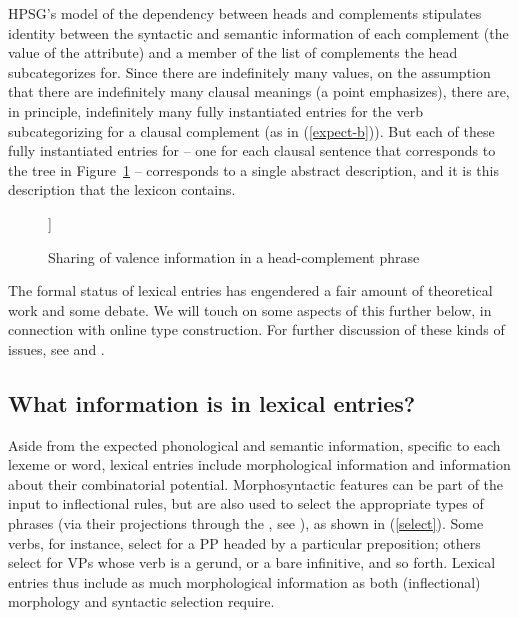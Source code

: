 \documentclass[output=paper
 	        ,biblatex
                ,babelshorthands
                ,newtxmath
                ,draftmode
                ,colorlinks, citecolor=brown
]{langscibook}
\begin{document}
HPSG's model of the dependency between heads and complements stipulates identity between the syntactic and semantic information of each complement (the value of the  attribute) and a member of the list of complements the head subcategorizes for. 
Since there are indefinitely many  values, on the assumption that there are indefinitely many clausal meanings (a point \citealt[8--9]{Jackendoff1990} emphasizes), there are, in principle, indefinitely many fully instantiated entries for the verb  subcategorizing for a clausal complement (as in (\ref{expect-b})). 
But each of these fully instantiated entries for  -- one for each clausal sentence that corresponds to the tree in Figure~\ref{expect-b-tree} -- corresponds to a single abstract description, and it is this description that the lexicon contains. 

\begin{figure}
	\begin{forest}
	[ [{\avm{[comps & < \1 >]}} ] 
	[{\avm{[synsem & \1 ]}} ] ]
\end{forest}	
\caption{\label{expect-b-tree} Sharing of valence information in a head-complement phrase}
\end{figure}


The formal status of lexical entries has engendered a fair amount of theoretical work and some debate.
We will touch on some aspects of this further below, in connection with online type construction.
For further discussion of these kinds of issues, see  and .

\subsection{What information is in lexical entries?}

Aside from the expected phonological and semantic information, specific to each lexeme or word, lexical entries include morphological information and information about their combinatorial potential. Morphosyntactic features can be part of the input to inflectional rules, but are also used to select the appropriate types of phrases (via their projections through the , see \crossrefchapteralt[\pageref{page-hfp}]{properties}), as shown in (\ref{select}). Some verbs, for instance, select for a PP headed by a particular preposition; others select for VPs whose verb is a gerund, or a bare infinitive, and so forth. Lexical entries thus include as much morphological information as both (inflectional) morphology and syntactic selection require.
\end{document}

